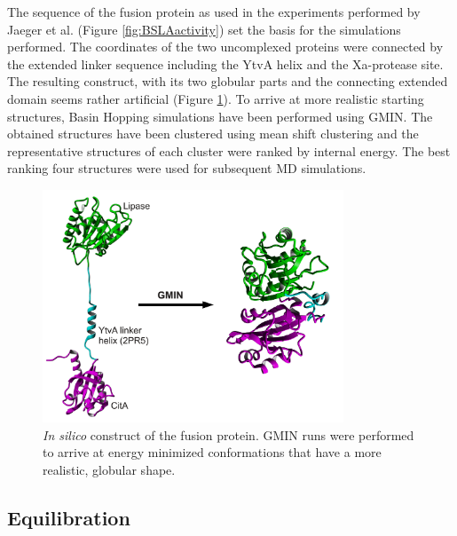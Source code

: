 \documentclass[english, a4paper, 12pt, titlepage, draft]{article}
\begin{document}
The sequence of the fusion protein as used in the experiments performed by Jaeger et al. (Figure \ref{fig:BSLAactivity}) set the basis for the simulations performed.
The coordinates of the two uncomplexed proteins were connected by the extended linker sequence including the YtvA helix and the Xa-protease site.
The resulting construct, with its two globular parts and the connecting extended domain seems rather artificial (Figure \ref{fig:ComplexConstruct}).
To arrive at more realistic starting structures, Basin Hopping simulations have been performed using GMIN.
The obtained structures have been clustered using mean shift clustering and the representative structures of each cluster were ranked by internal energy.
The best ranking four structures were used for subsequent MD simulations.


\begin{figure}
    \centering
    \includegraphics[width=0.8\textwidth]{figures/Complex_folding/complex_folding.pdf}
    \caption{\emph{In silico} construct of the fusion protein. GMIN runs were performed to arrive at energy minimized conformations that have a more realistic, globular shape.}
    \label{fig:ComplexConstruct}
\end{figure}      
 


\subsection{Equilibration}
\label{sec:eq}
\end{document}
